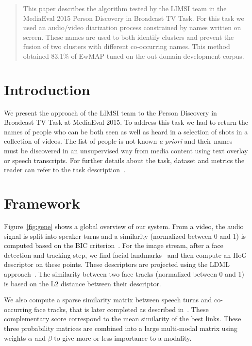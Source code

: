 \documentclass{acm_proc_article-me}
\begin{document}
\maketitle
\begin{abstract}

This paper describes the algorithm tested by the LIMSI team in the MediaEval 2015 Person Discovery in Broadcast TV Task. For this task we used an audio/video diarization process constrained by names written on screen. These names are used to both identify clusters and prevent the fusion of two clusters with different co-occurring names. This method obtained 83.1\% of EwMAP tuned on the out-domain development corpus.

\end{abstract}


\section{Introduction}

We present the approach of the LIMSI team to the Person Discovery in Broadcast TV Task at MediaEval 2015. To address this task we had to return the names of people who can be both seen as well as heard in a selection of shots in a collection of videos. The list of people is not known \emph{a priori} and their names must be discovered in an unsupervised way from media content using text overlay or speech transcripts. For further details about the task, dataset and metrics the reader can refer to the task description~\cite{POIGNANT--MEDIAEVAL--2015}.

\section{Framework}

Figure~\ref{fig:gene} shows a global overview of our system. From a video, the audio signal is split into speaker turns and a similarity (normalized between 0 and 1) is computed based on the BIC criterion~\cite{CHEN--DARPA--1998}. For the image stream, after a face detection and tracking step, we find facial landmarks~\cite{URICAR--VISAPP--2012} and then compute an HoG descriptor on these points. These descriptors are projected using the LDML approach~\cite{GUILLAUMIN--IJCV--2012}. The similarity between two face tracks (normalized between 0 and 1) is based on the L2 distance between their descriptor.

We also compute a sparse similarity matrix between speech turns and co-occurring face tracks, that is later completed as described in~\cite{POIGNANT--MTAP--2015}. These complementary score correspond to the mean similarity of the best links. These three probability matrices are combined into a large multi-modal matrix using weights $\alpha$ and $\beta$ to give more or less importance to a modality.
\end{document}
